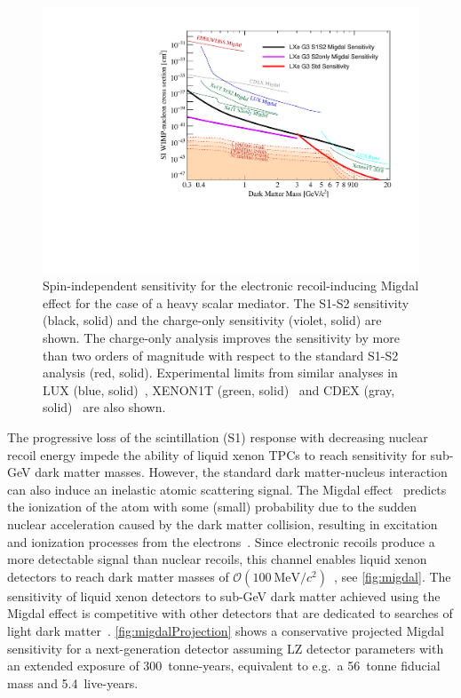 \begin{figure}[!htbp]
    \includegraphics[width=0.99\columnwidth]{fig_migdal_s2o_projection.pdf}
    \caption{Spin-independent sensitivity for the electronic recoil-inducing Migdal effect for the case of a heavy scalar mediator. The S1-S2 sensitivity (black, solid) and the charge-only sensitivity (violet, solid) are shown. The charge-only analysis improves the sensitivity by more than two orders of magnitude with respect to the standard S1-S2 analysis (red, solid). Experimental limits from similar analyses in LUX (blue, solid)~\cite{Akerib:2018hck}, XENON1T (green, solid)~\cite{Aprile:2019xxb} and CDEX (gray, solid)~\cite{Liu:2019kzq} are also shown.\label{fig:migdalProjection}}
\end{figure}

The progressive loss of the scintillation (S1) response with decreasing nuclear recoil energy impede the ability of liquid xenon TPCs to reach sensitivity for sub-GeV dark matter masses. However, the standard dark matter-nucleus interaction can also induce an inelastic atomic scattering signal. 
The Migdal effect~\cite{Migdal:1941} predicts the ionization of the atom with some (small) probability due to the sudden nuclear acceleration caused by the dark matter collision, resulting in excitation and ionization processes from the electrons~\cite{Ibe:2017yqa}. Since electronic recoils produce a more detectable signal than nuclear recoils, this channel enables liquid xenon detectors to reach dark matter masses of $\mathcal{O}(100\ {\textrm{MeV}/c^2})$~\cite{Dolan:2017xbu,Akerib:2018hck,Aprile:2019jmx}, see \autoref{fig:migdal}. The sensitivity of liquid xenon detectors to sub-GeV dark matter achieved using the Migdal effect is competitive with other detectors that are dedicated to searches of light dark matter~\cite{NEWS-G:2017pxg,CRESST:2019jnq,SuperCDMS:2020ymb}. \autoref{fig:migdalProjection} shows a conservative projected Migdal sensitivity for a next-generation detector assuming LZ detector parameters with an extended exposure of 300~tonne-years, equivalent to e.g.~a 56~tonne fiducial mass and 5.4~live-years. 

